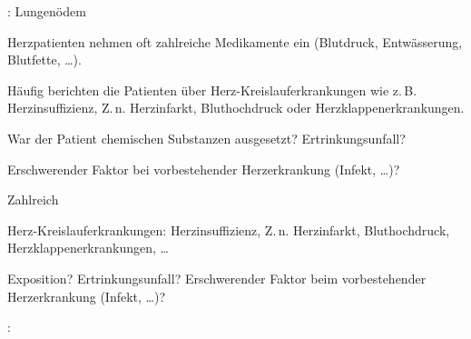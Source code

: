{{\TxSAMPLER}: Lungenödem}
{
\begin{SAMPLERText}
  \item[\SAMPLER{M}] Herzpatienten nehmen oft zahlreiche
  Medikamente ein (Blutdruck, Entwässerung, Blutfette,
  \ldots).
  \item[\SAMPLER{P}] Häufig berichten die Patienten über
  Herz-Kreislauferkrankungen wie z.\,B. Herzinsuffizienz,
  Z.\,n. Herzinfarkt, Bluthochdruck oder
  Herzklappenerkrankungen.
  \item[\SAMPLER{E}] War der Patient chemischen Substanzen ausgesetzt?
  Ertrinkungsunfall?
  
  Erschwerender Faktor bei vorbestehender Herzerkrankung
  (Infekt, \ldots)?
\end{SAMPLERText}
}
{
\begin{SAMPLERSlide}
  \item[\SAMPLER{M}] Zahlreich
  \item[\SAMPLER{P}] Herz-Kreislauferkrankungen: Herzinsuffizienz,
  Z.\,n. Herzinfarkt, Bluthochdruck,
  Herzklappenerkrankungen, \ldots
  \item[\SAMPLER{E}] Exposition? Ertrinkungsunfall?
  Erschwerender Faktor beim vorbestehender Herzerkrankung
  (Infekt, \ldots)?
\end{SAMPLERSlide}
}
{}
{}
{}


{ :
}{}
% 


